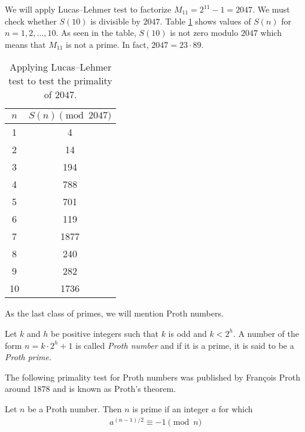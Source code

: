 	\begin{example}
		We will apply Lucas--Lehmer test to factorize $M_{11}=2^{11}-1=2047$. We must check whether $S(10)$ is divisible by $2047$. Table \ref{table:lucas-lehmer} shows values of $S(n)$ for $n=1,2,\ldots,10$. As seen in the table, $S(10)$ is not zero modulo $2047$ which means that $M_{11}$ is not a prime. In fact, $2047=23 \cdot 89$.
		\begin{table}
			\centering
			\begin{tabular}{|c|c|}
			\hline
			$n$ & $S(n) \pmod {2047}$ \\
			\hline
			1 & 4 \\
			\hline
			2 & 14 \\
			\hline
			3 & 194 \\
			\hline
			4 & 788 \\
			\hline
			5 & 701 \\
			\hline
			6 & 119 \\
			\hline
			7 & 1877 \\
			\hline
			8 & 240 \\
			\hline
			9 & 282 \\
			\hline
			10 & 1736 \\
			\hline
		\end{tabular}
		\caption{Applying Lucas--Lehmer test to test the primality of $2047$.}
		\label{table:lucas-lehmer}
		\end{table}
	\end{example}

As the last class of primes, we will mention Proth numbers.

	\begin{definition}
		Let $k$ and $h$ be positive integers such that $k$ is odd and $k < 2^h$. A number of the form $n=k \cdot 2^h +1$ is called \textit{Proth number} and if it is a prime, it is said to be a \textit{Proth prime}.
	\end{definition}

The following primality test for Proth numbers was published by Fran\c cois Proth around $1878$ and is known as Proth's theorem.

	\begin{theorem}
		Let $n$ be a Proth number. Then $n$ is prime if an integer $a$ for which
			\begin{align*}
				a^{(n-1)/2} \equiv -1 \pmod n
			\end{align*}
	\end{theorem}

